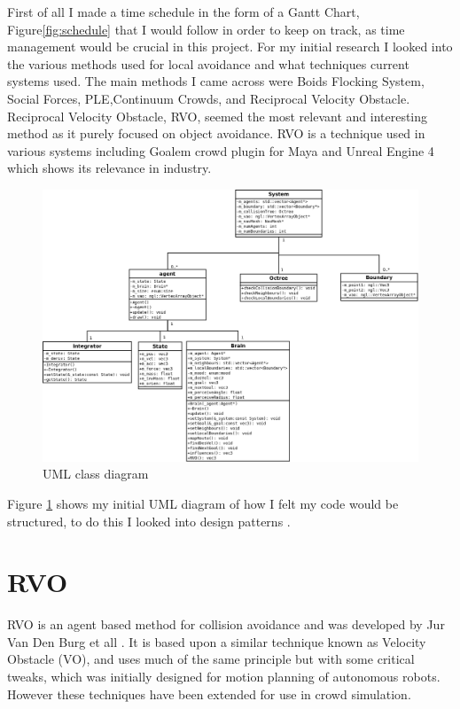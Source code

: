 \documentclass[a4paper,twocolumn]{article}
\begin{document}
First of all I made a time schedule in the form of a Gantt Chart, Figure\ref{fig:schedule} that I would follow in order to keep on track, as time management would be crucial in this project. For my initial research I looked into the various methods used for local avoidance and what techniques current systems used. The main methods I came across were Boids Flocking System\cite{CRBF}, Social Forces\cite{CLi2010CS}, PLE\cite{SG2010PLE},Continuum Crowds\cite{ATreuilleCS}, and Reciprocal Velocity Obstacle. Reciprocal Velocity Obstacle, RVO, seemed the most relevant and interesting method as it purely focused on object avoidance. RVO is a technique used in various systems including Goalem crowd plugin for Maya and Unreal Engine 4 which shows its relevance in industry.\\


\begin{figure}
\includegraphics[scale=0.13]{../umlDiagram/Agent_UML_diagram.png} 
\caption{UML class diagram}
\label{fig:umldiagram}
\end{figure}

Figure \ref{fig:umldiagram} shows my initial UML diagram of how I felt my code would be structured, to do this I looked into design patterns \cite{OODPWS}\cite{GPDSWS}.\\


\section{RVO}
RVO  is an agent based method for collision avoidance and was developed by Jur Van Den Burg et all \cite{JBerg2008RVO}. It is based upon a similar technique known as Velocity Obstacle (VO), and uses much of the same principle but with some critical tweaks, which was initially designed for motion planning of autonomous robots. However these techniques have been extended for use in crowd  simulation.
\end{document}
